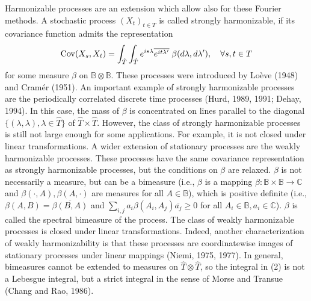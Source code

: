 \documentclass{article}
\newcommand{\cdummy}{\cdot}
\begin{document}
Harmonizable processes are an extension which allow also for these Fourier
methods. A stochastic process $(X_t)_{t \in T}$ is called strongly
harmonizable, if its covariance function admits the representation
\begin{equation}
  \mathrm{Cov} (X_s, X_t) = \int_{\hat{T}} \int_{\hat{T}} e^{is \lambda}
  \overline{e^{it \lambda'}} \hspace{0.27em} \beta (d \lambda, d \lambda'),
  \quad \forall s, t \in T
\end{equation}
for some measure $\beta$ on $\mathbb{B} \otimes \mathbb{B}$. These processes
were introduced by Lo{\`e}ve (1948) and Cram{\'e}r (1951). An important
example of strongly harmonizable processes are the periodically correlated
discrete time processes (Hurd, 1989, 1991; Dehay, 1994). In this case, the
mass of $\beta$ is concentrated on lines parallel to the diagonal $\{(\lambda,
\lambda), \lambda \in \hat{T} \}$ of $\hat{T} \times \hat{T}$. However, the
class of strongly harmonizable processes is still not large enough for some
applications. For example, it is not closed under linear transformations. A
wider extension of stationary processes are the weakly harmonizable processes.
These processes have the same covariance representation as strongly
harmonizable processes, but the conditions on $\beta$ are relaxed. $\beta$ is
not necessarily a measure, but can be a bimeasure (i.e., $\beta$ is a mapping
$\beta : \mathbb{B} \times \mathbb{B} \to \mathbb{C}$ and $\beta (\cdummy, A),
\beta (A, \cdot)$ are measures for all $A \in \mathbb{B}$), which is positive
definite (i.e., $\beta (A, B) = \overline{\beta (B, A)}$ and $\sum_{i, j} a_i
\beta (A_i, A_j) \overline{a_j} \geq 0$ for all $A_i \in \mathbb{B}, a_i \in
\mathbb{C}$). $\beta$ is called the spectral bimeasure of the process. The
class of weakly harmonizable processes is closed under linear transformations.
Indeed, another characterization of weakly harmonizability is that these
processes are coordinatewise images of stationary processes under linear
mappings (Niemi, 1975, 1977). In general, bimeasures cannot be extended to
measures on $\hat{T} \otimes \hat{T}$, so the integral in (2) is not a
Lebesgue integral, but a strict integral in the sense of Morse and Transue
(Chang and Rao, 1986).
\end{document}
